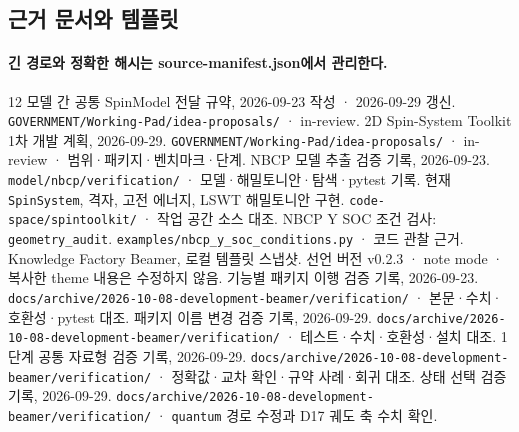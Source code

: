\subsection{근거 문서와 템플릿}\label{sources}
\begingroup%
  \framesubtitle{긴 경로와 정확한 해시는 source-manifest.json에서 관리한다.}
  \small
  \begin{thebibliography}{12}
      모델 간 공통 SpinModel 전달 규약, 2026-09-23 작성 · 2026-09-29 갱신.
      \newblock \texttt{GOVERNMENT/Working-Pad/idea-proposals/} · in-review.
      2D Spin-System Toolkit 1차 개발 계획, 2026-09-29.
      \newblock \texttt{GOVERNMENT/Working-Pad/idea-proposals/} · in-review · 범위·패키지·벤치마크·단계.
      NBCP 모델 추출 검증 기록, 2026-09-23.
      \newblock \texttt{model/nbcp/verification/} · 모델·해밀토니안·탐색·pytest 기록.
      현재 \texttt{SpinSystem}, 격자, 고전 에너지, LSWT 해밀토니안 구현.
      \newblock \texttt{code-space/spintoolkit/} · 작업 공간 소스 대조.
      NBCP Y SOC 조건 검사: \texttt{geometry\_audit}.
      \newblock \texttt{examples/nbcp\_y\_soc\_conditions.py} · 코드 관찰 근거.
      Knowledge Factory Beamer, 로컬 템플릿 스냅샷.
      \newblock 선언 버전 v0.2.3 · note mode · 복사한 theme 내용은 수정하지 않음.
      기능별 패키지 이행 검증 기록, 2026-09-23.
      \newblock \texttt{docs/archive/2026-10-08-development-beamer/verification/} · 본문·수치·호환성·pytest 대조.
      패키지 이름 변경 검증 기록, 2026-09-29.
      \newblock \texttt{docs/archive/2026-10-08-development-beamer/verification/} · 테스트·수치·호환성·설치 대조.
      1단계 공통 자료형 검증 기록, 2026-09-29.
      \newblock \texttt{docs/archive/2026-10-08-development-beamer/verification/} · 정확값·교차 확인·규약 사례·회귀 대조.
      상태 선택 검증 기록, 2026-09-29.
      \newblock \texttt{docs/archive/2026-10-08-development-beamer/verification/} · \texttt{quantum} 경로 수정과 D17 궤도 축 수치 확인.
  \end{thebibliography}
\endgroup


